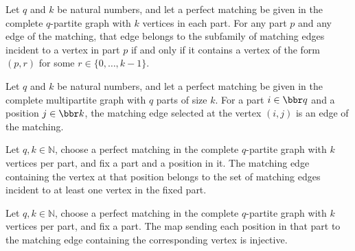 \begin{theorem}
\label{FABL.mem_graphMatchingPartEdges_iff}
\leanok
{}
Let $q$ and $k$ be natural numbers, and let a perfect matching be given in the complete
$q$-partite graph with $k$ vertices in each part. For any part $p$ and any edge of the
matching, that edge belongs to the subfamily of matching edges incident to a vertex in
part $p$ if and only if it contains a vertex of the form $(p,r)$ for some
$r\in\{0,\ldots,k-1\}$.
\end{theorem}

\begin{definition}
\label{FABL.graphMatchingPartEdge}
\leanok
{}
Let $q$ and $k$ be natural numbers, and let a perfect matching be given in the complete
multipartite graph with $q$ parts of size $k$. For a part $i \in \bbr q$ and a position
$j \in \bbr k$, the matching edge selected at the vertex $(i,j)$ is an edge of the
matching.
\end{definition}

\begin{theorem}
\label{FABL.graphMatchingPartEdge_mem}
\leanok
{}
Let $q,k\in\mathbb{N}$, choose a perfect matching in the complete $q$-partite graph with
$k$ vertices per part, and fix a part and a position in it. The matching edge containing
the vertex at that position belongs to the set of matching edges incident to at least
one vertex in the fixed part.
\end{theorem}

\begin{theorem}
\label{FABL.graphMatchingPartEdge_injective}
\leanok
{}
Let $q,k\in\mathbb{N}$, choose a perfect matching in the complete $q$-partite graph with
$k$ vertices per part, and fix a part. The map sending each position in that part to the
matching edge containing the corresponding vertex is injective.
\end{theorem}


